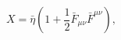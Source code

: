 \begin{equation}\label{detX}
X = {\bar \eta}\left(1 + \frac{1}{2}{\bar F_{\mu\nu}}
{\bar F^{\mu\nu}}\right),
\end{equation}

